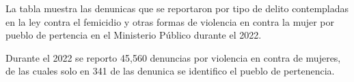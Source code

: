 La tabla muestra las denunicas que se reportaron por tipo de delito contempladas en la ley contra el femicidio y otras formas de violencia en contra la mujer por pueblo de pertencia en el Ministerio Público durante el 2022. 

Durante el 2022 se reporto 45,560 denuncias por violencia en contra de mujeres, de las cuales solo en 341 de las denunica se identifico el pueblo de pertenencia.
